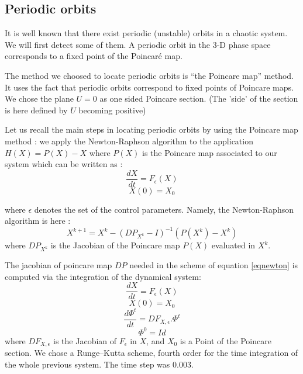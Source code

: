 \documentclass[12pt]{book}
\begin{document}
\subsection{Periodic orbits}

It is well known \cite{ma:equad:Guckenheimer83} that there exist periodic 
(unstable) orbits in a chaotic system. 
We will first detect some of them.
A periodic orbit in the 3-D phase space corresponds to a
fixed point of the Poincar\'e map.

The method we choosed to  locate periodic orbits is 
``the Poincare map'' method\cite{ma:compu:Parker89}.
It uses the fact that periodic orbits correspond to fixed
points of Poincare maps.
We chose the plane $U=0$ as one sided Poincare section.
(The 'side' of the section is here defined by $U$ becoming 
positive)

Let us recall the main steps in locating periodic orbits
by using the Poincare map method :
we apply
the Newton-Raphson algorithm to the application
$H(X)=P(X)-X$ where $P(X)$ is the Poincare map
associated to our system which can be written as :
\begin{equation}
\frac{dX}{dt}=F_\epsilon(X)
\end{equation}
\begin{equation}
X(0)=X_0
\end{equation}

where $\epsilon$ denotes the set of the control
parameters.
Namely, the Newton-Raphson algorithm is here :
\begin{equation}\label{eqnewton}
X^{k+1}=X^k-(DP_{X^k}-I)^{-1}(P(X^k)-X^k)
\end{equation}
where $DP_{X^k}$ is the Jacobian of the Poincare map
$P(X)$ evaluated in $X^k$.


The jacobian of poincare map $DP$ needed in the scheme
of equation \ref{eqnewton} is computed via 
the integration of
the dynamical system:
\begin{equation}
\frac{dX}{dt}=F_\epsilon(X)
\end{equation}
\begin{equation}
X(0)=X_0
\end{equation}
\begin{equation}
\frac{d\Phi^t}{dt}=DF_{X,\epsilon}.\Phi^t
\end{equation}
\begin{equation}
\Phi^0=Id
\end{equation}
where $DF_{X,\epsilon}$ is the Jacobian of $F_\epsilon$ in 
$X$, and $X_0$ is a Point of the Poincare section.
We chose a Runge--Kutta scheme, fourth order
\cite{ma:compu:Parker89,ma:compu:Press92} for the
time integration of the whole previous system.
The time step was $0.003$.
\end{document}
